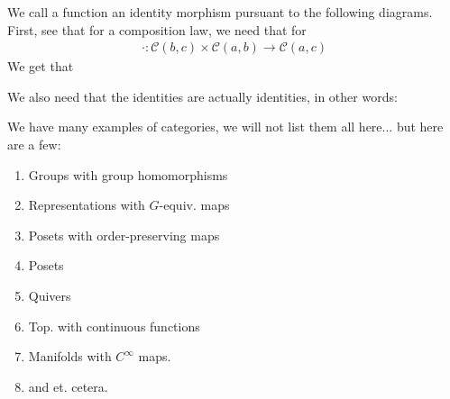 \documentclass[12pt, twosided]{article}
\begin{document}
We call a function an identity morphism pursuant to the following diagrams. First, see that for a composition law, we need that for 
\begin{align*}
  \cdot : \mathcal{C}(b,c)\times \mathcal{C}(a,b) \to \mathcal{C}(a, c)
\end{align*}
We get that 

\begin{center}
\end{center}
We also need that the identities are actually identities, in other words:

\begin{center}
\end{center}
We have many examples of categories, we will not list them all here... but here are a few:
\begin{exa}
  \begin{enumerate}
  \item Groups with group homomorphisms
  \item Representations with \(G\)-equiv. maps
  \item Posets with order-preserving maps
  \item Posets
  \item Quivers
  \item Top. with continuous functions
  \item Manifolds with \(C^\infty\) maps.
  \item and et. cetera.
  \end{enumerate}
\end{exa}
\end{document}
